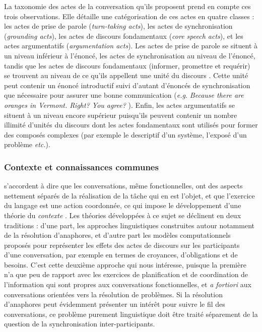 \documentclass[10pt,a4paper,twoside]{article}
\begin{document}
La taxonomie des actes de la conversation qu'ils proposent prend en compte ces trois observations. Elle détaille une catégorisation de ces actes en quatre classes : les actes de prise de parole (\textit{turn-taking acts}), les actes de synchronisation (\textit{grounding acts}), les actes de discours fondamentaux (\textit{core speech acts}), et les actes argumentatifs (\textit{argumentation acts}). Les actes de prise de parole se situent à un niveau inférieur à l'énoncé, les actes de synchronisation au niveau de l'énoncé, tandis que les actes de discours fondamentaux (informer, promettre et requérir) se trouvent au niveau de ce qu'ils appellent une \og unité du discours \fg. Cette unité peut contenir un énoncé introductif suivi d'autant d'énoncés de synchronisation que nécessaire pour assurer une bonne communication (\textit{e.g.} \textit{\og Because there are oranges in Vermont. Right? You agree? \fg}). Enfin, les actes argumentatifs se situent à un niveau encore supérieur puisqu'ils peuvent contenir un nombre illimité d'unités du discours dont les actes fondamentaux sont utilisés pour former des composés complexes (par exemple le descriptif d'un système, l'exposé d'un problème \textit{etc.}).

\subsubsection{Contexte et connaissances communes}

\citeauthor{poesio1997conversational} s'accordent à dire que les conversations, même fonctionnelles, ont des aspects nettement séparés de la réalisation de la tâche qui en est l'objet, et que l'exercice du langage est une action coordonnée, ce qui impose le développement d'une théorie du \textit{contexte} \cite{poesio1997conversational}. Les théories développées à ce sujet se déclinent en deux traditions : d'une part, les approches linguistiques construites autour notamment de la résolution d'anaphores, et d'autre part les modèles computationnels proposés pour représenter les effets des actes de discours sur les participants d'une conversation, par exemple en termes de croyances, d'obligations et de besoins. C'est cette deuxième approche qui nous intéresse, puisque la première n'a que peu de rapport avec les exercices de planification et de coordination de l'information qui sont propres aux conversations fonctionnelles, et \textit{a fortiori} aux conversations orientées vers la résolution de problèmes. Si la résolution d'anaphores peut évidemment présenter un intérêt pour suivre le fil des conversations, ce problème purement linguistique doit être traité séparement de la question de la synchronisation inter-participants.
\end{document}
